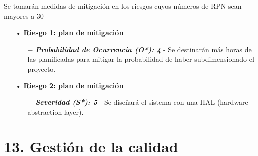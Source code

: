 \documentclass[11pt]{charter}
\begin{document}
Se tomarán medidas de mitigación en los riesgos cuyos números de RPN sean mayores a 30


 
\begin{itemize}
 \item[•] \textbf{Riesgo 1: plan de mitigación}
  \begin{itemize}
  	\item[$-$] \textit{\textbf{Probabilidad de Ocurrencia (O*): 4}} - Se destinarán más horas de las planificadas para mitigar la probabilidad de haber subdimensionado el proyecto.
  \end{itemize}
\end{itemize}

\begin{itemize}
 \item[•] \textbf{Riesgo 2: plan de mitigación}
  \begin{itemize}
  	\item[$-$] \textit{\textbf{Severidad (S*): 5}} - Se diseñará el sistema con una HAL (hardware abstraction layer).
  \end{itemize}
\end{itemize}

 



\section{13. Gestión de la calidad}
\label{sec:calidad}

\end{document}
